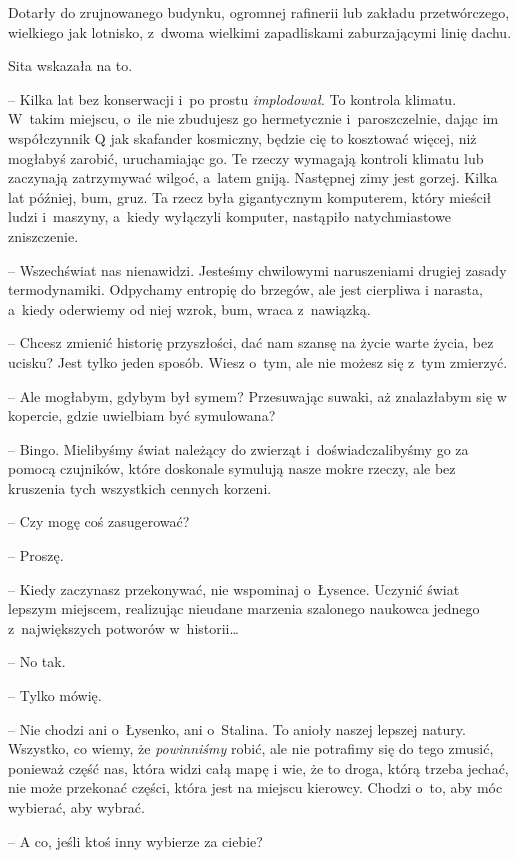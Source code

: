 \documentclass[oneside,polish,11pt,sfheadings]{mwbk}
\begin{document}
Dotarły do zrujnowanego budynku, ogromnej rafinerii lub zakładu
przetwórczego, wielkiego jak lotnisko, z~dwoma wielkimi zapadliskami
zaburzającymi linię dachu.

Sita wskazała na to. 

-- Kilka lat bez konserwacji i~po prostu
\textit{implodował}. To kontrola klimatu. W~takim miejscu, o~ile nie
zbudujesz go hermetycznie i~paroszczelnie, dając im współczynnik Q jak
skafander kosmiczny, będzie cię to kosztować więcej, niż mogłabyś
zarobić, uruchamiając go. Te rzeczy wymagają kontroli klimatu lub
zaczynają zatrzymywać wilgoć, a~latem gniją. Następnej zimy jest gorzej.
Kilka lat później, bum, gruz. Ta rzecz była gigantycznym komputerem,
który mieścił ludzi i~maszyny, a~kiedy wyłączyli komputer, nastąpiło
natychmiastowe zniszczenie.

-- Wszechświat nas nienawidzi. Jesteśmy chwilowymi naruszeniami drugiej
zasady termodynamiki. Odpychamy entropię do brzegów, ale jest cierpliwa
i narasta, a~kiedy oderwiemy od niej wzrok, bum, wraca z~nawiązką.

-- Chcesz zmienić historię przyszłości, dać nam szansę na życie warte
życia, bez ucisku? Jest tylko jeden sposób. Wiesz o~tym, ale nie możesz
się z~tym zmierzyć.

-- Ale mogłabym, gdybym był symem? Przesuwając suwaki, aż znalazłabym się
w kopercie, gdzie uwielbiam być symulowana?

-- Bingo. Mielibyśmy świat należący do zwierząt i~doświadczalibyśmy go za
pomocą czujników, które doskonale symulują nasze mokre rzeczy, ale bez
kruszenia tych wszystkich cennych korzeni.

-- Czy mogę coś zasugerować?

-- Proszę.

-- Kiedy zaczynasz przekonywać, nie wspominaj o~Łysence. Uczynić świat
lepszym miejscem, realizując nieudane marzenia szalonego naukowca
jednego z~największych potworów w~historii\ldots 

-- No tak.

-- Tylko mówię.

-- Nie chodzi ani o~Łysenko, ani o~Stalina. To anioły naszej lepszej
natury. Wszystko, co wiemy, że \textit{powinniśmy} robić, ale nie
potrafimy się do tego zmusić, ponieważ część nas, która widzi całą mapę
i wie, że to droga, którą trzeba jechać, nie może przekonać części,
która jest na miejscu kierowcy. Chodzi o~to, aby móc wybierać, aby
wybrać.

-- A co, jeśli ktoś inny wybierze za ciebie?
\end{document}
